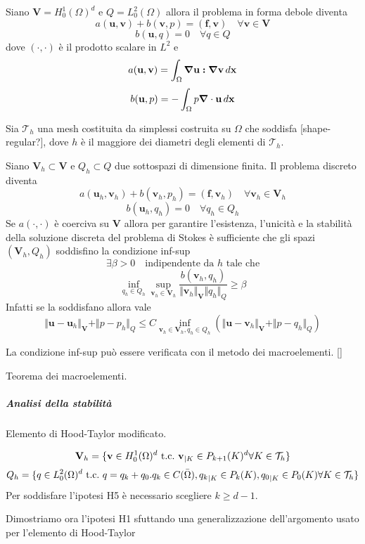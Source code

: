 Siano $\mathbf{V}=H^1_0(\Omega)^d$ e $Q=L^2_0(\Omega)$ allora il problema in forma debole diventa
$$a(\mathbf{u},\mathbf{v})+b(\mathbf{v},p)=(\mathbf{f},\mathbf{v})\quad\forall\mathbf{v}\in\mathbf{V}$$
$$b(\mathbf{u},q)=0\quad\forall q\in Q$$
dove $(\cdot,\cdot)$ è il prodotto scalare in $L^2$ e
$$a(\mathbf{u},\mathbf{v})=\int_{\Omega}\boldsymbol{\nabla}\mathbf{u}\boldsymbol{:}\boldsymbol{\nabla}\mathbf{v}\,d\mathbf{x}$$
$$b(\mathbf{u},p)=-\int_{\Omega}p\boldsymbol{\nabla}\cdot\mathbf{u}\,d\mathbf{x}$$

Sia $\mathcal{T}_h$ una mesh costituita da simplessi costruita su $\Omega$ che soddisfa [shape-regular?], dove $h$ è il maggiore dei diametri degli elementi di $\mathcal{T}_h$.

Siano $\mathbf{V}_h\subset\mathbf{V}$ e $Q_h\subset Q$ due sottospazi di dimensione finita. Il problema discreto diventa
$$a(\mathbf{u}_h,\mathbf{v}_h)+b(\mathbf{v}_h,p_h)=(\mathbf{f},\mathbf{v}_h)\quad\forall\mathbf{v}_h\in\mathbf{V}_h$$
$$b(\mathbf{u}_h,q_h)=0\quad\forall q_h\in Q_h$$
Se $a(\cdot,\cdot)$ è coerciva su $\mathbf{V}$ allora per garantire l'esistenza, l'unicità e la stabilità della soluzione discreta del problema di Stokes è sufficiente che gli spazi $(\mathbf{V}_h,Q_h)$ soddisfino la condizione inf-sup
$$\exists\beta>0\quad\text{indipendente da $h$ tale che}$$
$$\inf_{q_h\in Q_h}\sup_{\mathbf{v}_h\in\mathbf{V}_h}\frac{b(\mathbf{v}_h,q_h)}{\Vert\mathbf{v}_h\Vert_{\mathbf{V}}\Vert q_h\Vert_{Q}}\geq\beta$$
Infatti se la soddisfano allora vale
$$\Vert\mathbf{u}-\mathbf{u}_h\Vert_{\mathbf{V}}+\Vert p - p_h \Vert_{Q}\leq C\inf_{\mathbf{v}_h\in\mathbf{V}_h,q_h\in Q_h}(\Vert\mathbf{u}-\mathbf{v}_h\Vert_{\mathbf{V}}+\Vert p - q_h \Vert_{Q})$$

La condizione inf-sup può essere verificata con il metodo dei macroelementi. []

Teorema dei macroelementi.

\subparagraph{Analisi della stabilità}

Elemento di Hood-Taylor modificato.

$$\mathbf{V}_h=\{\mathbf{v}\in H^1_0(\Omega)^d\ \text{t.c.}\ \mathbf{v}_{\vert K}\in P_{k+1}(K)^d\forall K\in\mathcal{T}_h \}$$
$$Q_h=\{ q\in L^2_0(\Omega)^d\ \text{t.c.}\  q=q_k+q_0. q_k\in C(\bar{\Omega}),{q_k}_{\vert K}\in P_k(K), {q_0}_{\vert K}\in P_0(K)\forall K\in\mathcal{T}_h \}$$
Per soddisfare l'ipotesi H5 è necessario scegliere $k\geq d-1$.

Dimostriamo ora l'ipotesi H1 sfuttando una generalizzazione dell'argomento usato per l'elemento di Hood-Taylor

